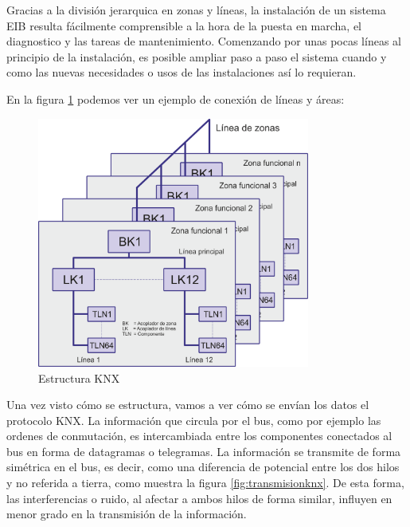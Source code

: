 Gracias a la división jerarquica en zonas y líneas, la instalación de un sistema EIB resulta f\'acilmente comprensible a la hora de la puesta en marcha, el diagnostico y las tareas de mantenimiento. Comenzando por unas pocas líneas al principio de la instalación, es posible ampliar paso a paso el sistema cuando y como las nuevas necesidades o usos de las instalaciones así lo requieran.


En la figura \ref{fig:estructuraknx} podemos ver un ejemplo de conexión de líneas y \'areas:

\begin{figure}[ht]
	\centering
		\includegraphics[width=0.8\textwidth]{imagenes/Acopladores-Knx.png}
	\caption{Estructura KNX}
	\label{fig:estructuraknx}
\end{figure}


Una vez visto cómo se estructura, vamos a ver cómo se envían los datos el protocolo KNX. La información que circula por el bus, como por ejemplo las ordenes de conmutación, es intercambiada entre los componentes conectados al bus en forma de datagramas o telegramas. La información se transmite de forma simétrica en el bus, es decir, como una diferencia de potencial entre los dos hilos y no referida a tierra, como muestra la figura \ref{fig:transmisionknx}. De esta forma, las interferencias o ruido, al afectar a ambos hilos de forma similar, influyen en menor grado en la transmisión de la información. 


